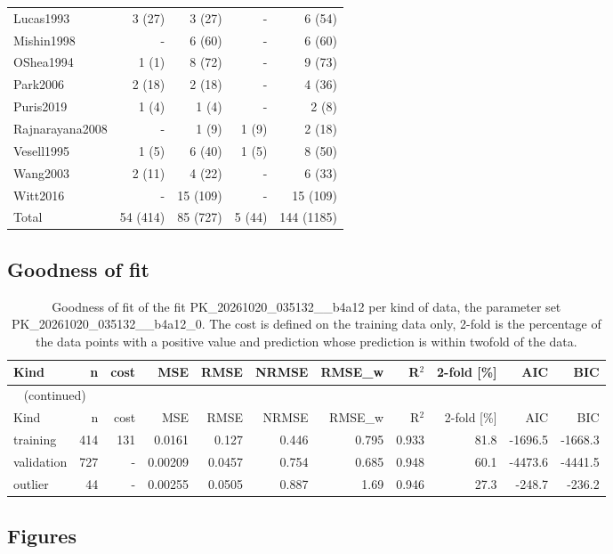 \begin{longtable}{lrrrr}
Lucas1993 & 3 (27) & 3 (27) & - & 6 (54) \\
Mishin1998 & - & 6 (60) & - & 6 (60) \\
OShea1994 & 1 (1) & 8 (72) & - & 9 (73) \\
Park2006 & 2 (18) & 2 (18) & - & 4 (36) \\
Puris2019 & 1 (4) & 1 (4) & - & 2 (8) \\
Rajnarayana2008 & - & 1 (9) & 1 (9) & 2 (18) \\
Vesell1995 & 1 (5) & 6 (40) & 1 (5) & 8 (50) \\
Wang2003 & 2 (11) & 4 (22) & - & 6 (33) \\
Witt2016 & - & 15 (109) & - & 15 (109) \\
Total & 54 (414) & 85 (727) & 5 (44) & 144 (1185) \\
\end{longtable}

\subsection{Goodness of fit}

\begin{longtable}{lrrrrrrrrrr}
\caption{Goodness of fit of the fit PK\_20261020\_035132\_\_b4a12 per kind of data, the parameter set PK\_20261020\_035132\_\_b4a12\_0. The cost is defined on the training data only, 2-fold is the percentage of the data points with a positive value and prediction whose prediction is within twofold of the data.}\label{tab:metrics:PK_20261020_035132__b4a12} \\
\toprule
Kind & n & cost & MSE & RMSE & NRMSE & RMSE\_w & R\ensuremath{^{2}} & 2-fold [\%] & AIC & BIC \\
\midrule
\endfirsthead
\multicolumn{11}{l}{\small\tablename~\thetable{} (continued)} \\
\toprule
Kind & n & cost & MSE & RMSE & NRMSE & RMSE\_w & R\ensuremath{^{2}} & 2-fold [\%] & AIC & BIC \\
\midrule
\endhead
\bottomrule
\endlastfoot
training & 414 & 131 & 0.0161 & 0.127 & 0.446 & 0.795 & 0.933 & 81.8 & -1696.5 & -1668.3 \\
validation & 727 & - & 0.00209 & 0.0457 & 0.754 & 0.685 & 0.948 & 60.1 & -4473.6 & -4441.5 \\
outlier & 44 & - & 0.00255 & 0.0505 & 0.887 & 1.69 & 0.946 & 27.3 & -248.7 & -236.2 \\
\end{longtable}

\subsection{Figures}

